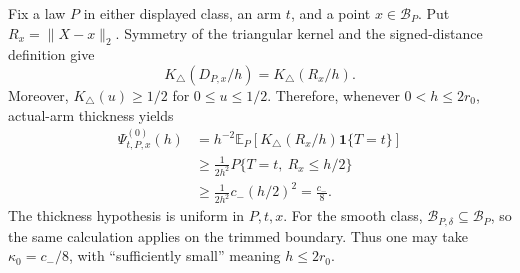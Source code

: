 Fix a law \(P\) in either displayed class, an arm \(t\), and a point \(x\in\mathcal B_P\).  Put \(R_x=\lVert X-x\rVert_2\).  Symmetry of the triangular kernel and the signed-distance definition give
\[
 K_\triangle(D_{P,x}/h)=K_\triangle(R_x/h).
\]
Moreover, \(K_\triangle(u)\geq1/2\) for \(0\leq u\leq1/2\).  Therefore, whenever \(0<h\leq2r_0\), actual-arm thickness yields
\[
\begin{aligned}
 \Psi^{(0)}_{t,P,x}(h)
 &=h^{-2}\mathbb E_P\!\left[
 K_\triangle(R_x/h)\mathbf1\{T=t\}\right]\\
 &\geq \frac1{2h^2}P\{T=t,\ R_x\leq h/2\}\\
 &\geq \frac1{2h^2}c_-(h/2)^2
 =\frac{c_-}{8}.
\end{aligned}
\]
The thickness hypothesis is uniform in \(P,t,x\).  For the smooth class, \(\mathcal B_{P,\delta}\subseteq\mathcal B_P\), so the same calculation applies on the trimmed boundary.  Thus one may take \(\kappa_0=c_-/8\), with ``sufficiently small'' meaning \(h\leq2r_0\).